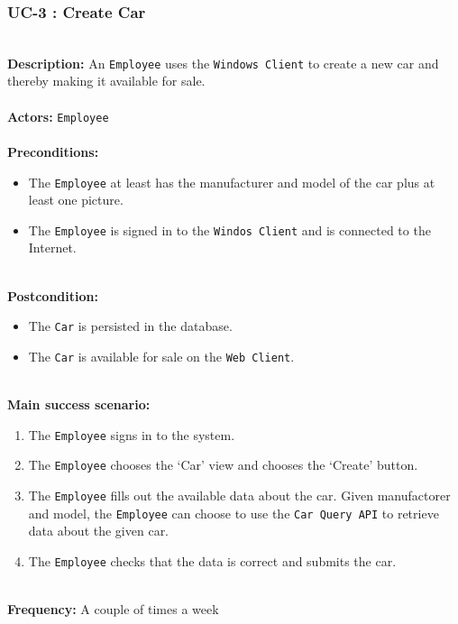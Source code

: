 \subsubsection{UC-3 : Create Car}
\label{create_car_use_case}
\HRule \\[0.4cm]
\textbf{Description:} An \texttt{Employee} uses the \texttt{Windows Client} to create a new car and thereby making it available for sale. \\
\HRule \\[0.4cm]
\textbf{Actors:} \texttt{Employee}\\
\HRule \\[0.4cm]
\textbf{Preconditions:} 
\begin{itemize}
    \item The \texttt{Employee} at least has the manufacturer and model of the car plus at least one picture.
    \item The \texttt{Employee} is signed in to the \texttt{Windos Client} and is connected to the Internet.
\end{itemize}
\HRule \\[0.4cm]
\textbf{Postcondition:}
\begin{itemize}
    \item The \texttt{Car} is persisted in the database.
    \item The \texttt{Car} is available for sale on the \texttt{Web Client}.
\end{itemize}
\HRule \\[0.4cm]
\textbf{Main success scenario:}
\begin{enumerate}
    \item The \texttt{Employee} signs in to the system.
    \item The \texttt{Employee} chooses the `Car' view and chooses the `Create' button.
    \item The \texttt{Employee} fills out the available data about the car. Given manufactorer and model, the \texttt{Employee} can choose to use the \texttt{Car Query API} to retrieve data about the given car.
    \item The \texttt{Employee} checks that the data is correct and submits the car.
\end{enumerate}
\HRule \\[0.4cm]
\textbf{Frequency:}
A couple of times a week \\
\HRule \\[0.4cm]

